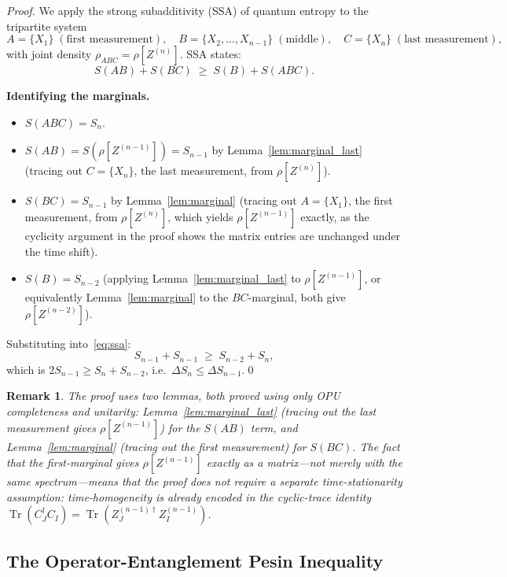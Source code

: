 \documentclass[12pt,a4paper]{article}
\newtheorem{remark}[theorem]{Remark}
\begin{document}
\begin{proof}
We apply the strong subadditivity (SSA) of quantum entropy to the tripartite
system
\[
  A = \{X_1\}\;(\text{first measurement}),\quad
  B = \{X_2,\ldots,X_{n-1}\}\;(\text{middle}),\quad
  C = \{X_n\}\;(\text{last measurement}),
\]
with joint density $\rho_{ABC} = \rho[Z^{(n)}]$.  SSA states:
\begin{equation}\label{eq:ssa}
  S(AB) + S(BC) \;\ge\; S(B) + S(ABC).
\end{equation}

\textbf{Identifying the marginals.}
\begin{itemize}
\item $S(ABC) = S_n$.
\item $S(AB) = S(\rho[Z^{(n-1)}]) = S_{n-1}$ by Lemma~\ref{lem:marginal_last}
  (tracing out $C = \{X_n\}$, the last measurement, from $\rho[Z^{(n)}]$).
\item $S(BC) = S_{n-1}$ by Lemma~\ref{lem:marginal}
  (tracing out $A = \{X_1\}$, the first measurement, from $\rho[Z^{(n)}]$,
  which yields $\rho[Z^{(n-1)}]$ exactly, as the cyclicity argument in the proof
  shows the matrix entries are unchanged under the time shift).
\item $S(B) = S_{n-2}$ (applying Lemma~\ref{lem:marginal_last} to $\rho[Z^{(n-1)}]$,
  or equivalently Lemma~\ref{lem:marginal} to the $BC$-marginal, both give
  $\rho[Z^{(n-2)}]$).
\end{itemize}
Substituting into~\eqref{eq:ssa}:
\[
  S_{n-1} + S_{n-1} \;\ge\; S_{n-2} + S_n,
\]
which is $2S_{n-1}\ge S_n+S_{n-2}$, i.e.\ $\Delta S_n \le \Delta S_{n-1}$.\qed
\end{proof}

\begin{remark}
The proof uses two lemmas, both proved using only OPU completeness and unitarity:
Lemma~\ref{lem:marginal_last} (tracing out the last measurement gives $\rho[Z^{(n-1)}]$)
for the $S(AB)$ term, and Lemma~\ref{lem:marginal} (tracing out the first measurement)
for $S(BC)$.  The fact that the first-marginal gives $\rho[Z^{(n-1)}]$ \emph{exactly}
as a matrix—not merely with the same spectrum—means that the proof does not require a
separate time-stationarity assumption: time-homogeneity is already encoded in the
cyclic-trace identity $\operatorname{Tr}(C_J^\dagger C_I) = \operatorname{Tr}(Z^{(n-1)\dagger}_J Z^{(n-1)}_I)$.
\end{remark}

\subsection{The Operator-Entanglement Pesin Inequality}
\end{document}
